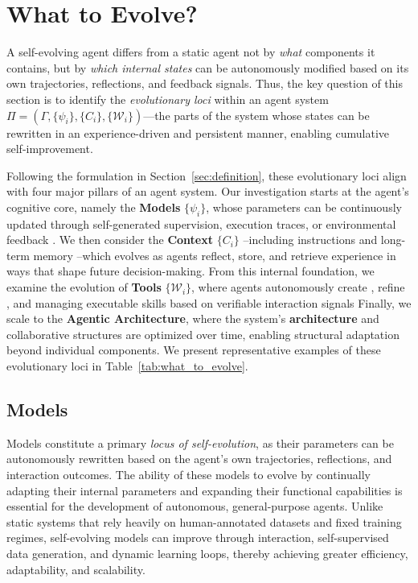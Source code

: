 
\section{What to Evolve?}
\label{sec:what}

A self-evolving agent differs from a static agent not by \emph{what} components it contains,
but by \emph{which internal states} can be autonomously modified based on its own
trajectories, reflections, and feedback signals.  
Thus, the key question of this section is to identify the \textit{evolutionary loci} within an
agent system $\Pi = (\Gamma, \{\psi_i\}, \{C_i\}, \{\mathcal{W}_i\})$—the parts of the system whose
states can be rewritten in an experience-driven and persistent manner, enabling cumulative self-improvement.


Following the formulation in Section~\ref{sec:definition}, 
these evolutionary loci align with four major pillars of an agent system.
Our investigation starts at the agent's cognitive core, namely the \textbf{Models} 
$\{\psi_i\}$,
whose parameters can be continuously updated through self-generated supervision, execution traces, or environmental feedback
\citep{zhou2025selfchallenginglanguagemodelagents, wang2025ragen}. 
We then consider the \textbf{Context} $\{C_i\}$ 
--including instructions
\citep{xiang2025self, khattab2023dspy} 
and long-term memory
\citep{chhikara2025mem0, wang2024agent}
--which evolves as agents reflect, store, and retrieve experience in ways that
shape future decision-making.
From this internal foundation, we 
examine the evolution of
\textbf{Tools} $\{\mathcal{W}_i\}$,
where agents autonomously create
\citep{qiu2025alita}, 
refine
\citep{fromexplorationtomastery}, 
and managing
\citep{wang2025toolgen} 
executable skills based on verifiable interaction signals
Finally, we scale 
to the \textbf{Agentic Architecture}, where the system’s
\textbf{architecture}
\citep{hu2024automated, zhang2024aflow} 
and collaborative structures
\citep{wan2025remalearningmetathinkllms} 
are optimized over time, enabling structural adaptation beyond individual components.
We present 
representative examples of these evolutionary loci in Table~\ref{tab:what_to_evolve}.


\subsection{Models}

Models constitute a primary \emph{locus of self-evolution}, as their parameters can be
autonomously rewritten based on the agent’s own trajectories, reflections, and
interaction outcomes.
The ability of these models to evolve by continually adapting their internal parameters and expanding their functional capabilities
is essential for the development of autonomous, general-purpose agents. 
Unlike static systems that rely heavily on human-annotated datasets and fixed training regimes, 
self-evolving models can improve through interaction, self-supervised data generation, and dynamic learning loops, thereby achieving greater efficiency, adaptability, and scalability.

